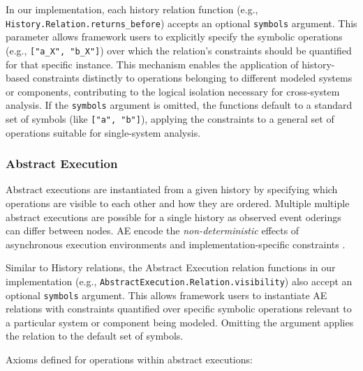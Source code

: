 In our implementation, each history relation function (e.g., \texttt{History.Relation.returns\_before})
accepts an optional \texttt{symbols} argument. This parameter allows framework users to
explicitly specify the symbolic operations (e.g., \texttt{["a\_X", "b\_X"]}) over which
the relation's constraints should be quantified for that specific instance. This
mechanism enables the application of history-based constraints distinctly to
operations belonging to different modeled systems or components, contributing to
the logical isolation necessary for cross-system analysis. If the \texttt{symbols} argument
is omitted, the functions default to a standard set of symbols (like \texttt{["a", "b"]}),
applying the constraints to a general set of operations suitable for
single-system analysis.

\subsubsection{Abstract Execution}

%
%

Abstract executions are instantiated from a given history by specifying which
operations are visible to each other and how they are ordered. Multiple multiple
abstract executions are possible for a single history as observed event oderings
can differ between nodes. AE encode the \textit{non-deterministic} effects of
asynchronous execution environments and implementation-specific constraints
\cite{burckhardt2014principles} \cite{viotti2016consistency}.

Similar to History relations, the Abstract Execution relation functions in our
implementation (e.g., \texttt{AbstractExecution.Relation.visibility}) also accept an
optional \texttt{symbols} argument. This allows framework users to instantiate AE
relations with constraints quantified over specific symbolic operations relevant
to a particular system or component being modeled. Omitting the argument applies
the relation to the default set of symbols.

Axioms defined for operations within abstract executions:

